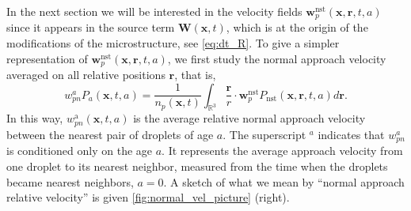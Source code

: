 In the next section we will be interested in the velocity fields $\textbf{w}_p^\text{nst}(\textbf{x},\textbf{r},t,a)$ since it appears in the source term $\textbf{W}(\textbf{x},t)$, which is at the origin of the modifications of the microstructure, see \ref{eq:dt_R}. 
To give a simpler representation of $\textbf{w}_p^\text{nst}(\textbf{x},\textbf{r},t,a)$, we first study the normal approach velocity averaged on all relative positions $\textbf{r}$, that is,  
\begin{equation*}
    w_{pn}^aP_a(\textbf{x},t,a)
    = \frac{1}{n_p(\textbf{x},t)}
    \int_{\mathbb{R}^3}
    \frac{\textbf{r}}{r} \cdot \textbf{w}^\text{nst}_p
    P_\text{nst}(\textbf{x},\textbf{r},t,a) d\textbf{r}.
\end{equation*}
In this way, $w^\text{a}_{pn}(\textbf{x},t,a)$ is the average relative normal approach velocity between the nearest pair of droplets of age $a$. 
The superscript $^a$ indicates that $w_{pn}^a$ is conditioned only on the age $a$. 
It represents the average approach velocity from one droplet to its nearest neighbor, measured from the time when the droplets became nearest neighbors, $a=0$.
A sketch of what we mean by ``normal approach relative velocity'' is given \ref{fig:normal_vel_picture} (right). 
